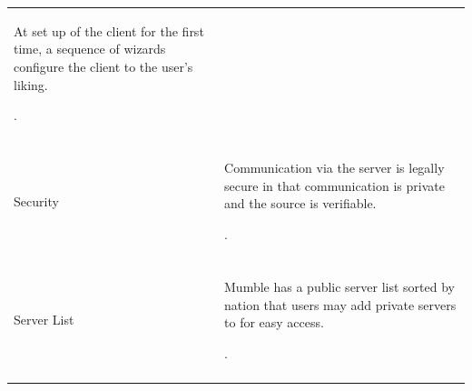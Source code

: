 \documentclass[twoside, titlepage]{article}
\newcommand{\OOS}{Mumble Client}
\newcommand{\usabilitymethod}{[Usability Method]}
\begin{document}
\begin{tabular}[t]{ll}
\begin{minipage}{0.5\textwidth}
			At set up of the client for the first time, a
			sequence of wizards configure the client to
			the user's liking.
		\end{minipage}. \\\\
		Security & \begin{minipage}{0.5\textwidth}
			Communication via the server is legally secure
			in that communication is private and the source
			is verifiable.
		\end{minipage}. \\\\
		\rowcolor{gray}
		Server List & \begin{minipage}{0.5\textwidth}
			Mumble has a public server list sorted by nation
			that users may add private servers to for easy 
			access.
		\end{minipage}. \\\\
	\end{tabular}
\end{document}
